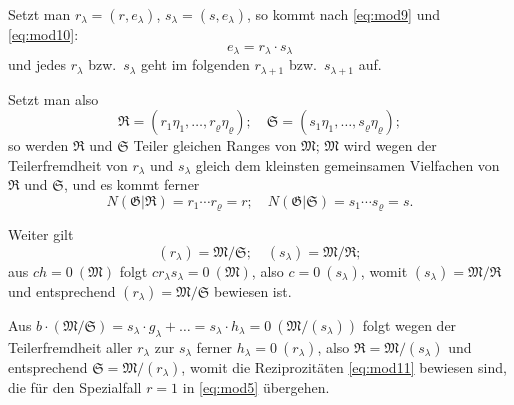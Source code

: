 \documentclass[fontsize=10pt,paper=a5,pagesize,headings=small]{scrbook}
\theoremstyle{plain}
\begin{document}
\newpage
\setcounter{page}{431}

Setzt man $r_\lambda = (r, e_\lambda)$, $s_\lambda = (s, e_\lambda)$, so kommt nach \eqref{eq:mod9} und
\eqref{eq:mod10}:
\[ e_\lambda = r_\lambda \cdot s_\lambda \]
und jedes $r_\lambda$ bzw.~$s_\lambda$ geht im folgenden $r_{\lambda+1}$ bzw.~$s_{\lambda+1}$ auf.

Setzt man also
\[ \mathfrak{R} = (r_1\eta_1,\dots,r_\varrho\eta_\varrho);\quad \mathfrak{S} = (s_1\eta_1,\dots,s_\varrho\eta_\varrho); \]
so werden $\mathfrak{R}$ und $\mathfrak{S}$ Teiler gleichen Ranges von $\mathfrak{M}$; $\mathfrak{M}$ wird wegen der Teilerfremdheit von $r_\lambda$
und $s_\lambda$ gleich dem kleinsten gemeinsamen Vielfachen von $\mathfrak{R}$ und $\mathfrak{S}$, und es kommt ferner
\[ N(\mathfrak{G}|\mathfrak{R}) = r_1 \cdots r_\varrho = r;\quad N(\mathfrak{G}|\mathfrak{S}) = s_1 \cdots s_\varrho = s. \]

Weiter gilt
\[ (r_\lambda) = \mathfrak{M}/\mathfrak{S};\quad (s_\lambda) = \mathfrak{M}/\mathfrak{R}; \]
aus $ch = 0\ (\mathfrak{M})$ folgt $cr_\lambda s_\lambda = 0\ (\mathfrak{M})$, also $c = 0\ (s_\lambda)$, womit
$(s_\lambda) = \mathfrak{M}/\mathfrak{R}$ und entsprechend $(r_\lambda) = \mathfrak{M}/\mathfrak{S}$ bewiesen ist.

Aus $b \cdot (\mathfrak{M}/\mathfrak{S}) = s_\lambda \cdot g_\lambda + \dots = s_\lambda \cdot h_\lambda = 0\ (\mathfrak{M}/(s_\lambda))$
folgt wegen der Teilerfremdheit aller $r_\lambda$ zur $s_\lambda$ ferner $h_\lambda = 0\ (r_\lambda)$, also
$\mathfrak{R} = \mathfrak{M}/(s_\lambda)$ und entsprechend $\mathfrak{S} = \mathfrak{M}/(r_\lambda)$, womit die Reziprozitäten \eqref{eq:mod11}
bewiesen sind, die für den Spezialfall $r = 1$ in \eqref{eq:mod5} übergehen.
\end{document}
